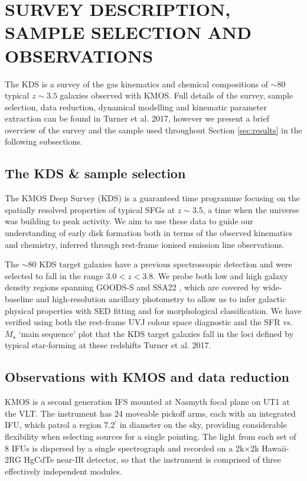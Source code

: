 \documentclass[a4paper,fleqn,usenatbib]{mn2e}
\begin{document}
\section{SURVEY DESCRIPTION, SAMPLE SELECTION AND OBSERVATIONS}\label{sec:sample_and_dr}
The KDS is a survey of the gas kinematics and chemical compositions of $\sim80$typical $z\sim3.5$ galaxies observed with KMOS.
Full details of the survey, sample selection, data reduction, dynamical modelling and kinematic parameter extraction can be found in Turner et al. 2017, however we present a brief overview of the survey and the sample used throughout Section \ref{sec:results} in the following subsections.

\subsection{The KDS \& sample selection}\label{subsec:sample_selection}
The KMOS Deep Survey (KDS) is a guaranteed time programme focusing on the spatially resolved properties of typical SFGs at $z\sim3.5$, a time when the universe was building to peak activity.
We aim to use these data to guide our understanding of early disk formation both in terms of the observed kinematics and chemistry, inferred through rest-frame ionised emission line observations.

The $\sim80$ KDS target galaxies have a previous spectroscopic detection and were selected to fall in the range $3.0 < z < 3.8$.
We probe both low and high galaxy density regions spanning GOODS-S \citep[e.g.][]{Koekemoer2011,Grogin2011,Guo2013} and SSA22 \citep[e.g.][]{Steidel1998}, which are covered by wide-baseline and high-resolution ancillary photometry to allow us to infer galactic physical properties with SED fitting and for morphological classification.
We have verified using both the rest-frame UVJ colour space diagnostic and the SFR vs. $M_{\star}$ `main sequence' plot that the KDS target galaxies fall in the loci defined by typical star-forming at these redshifts Turner et al. 2017. 
\subsection{Observations with KMOS and data reduction}\label{subsec:kmos_observations}
KMOS is a second generation IFS mounted at Nasmyth focal plane on UT1 at the VLT.
The instrument has 24 moveable pickoff arms, each with an integrated IFU, which patrol a region 7.2$^{\prime}$ in diameter on the sky, providing considerable flexibility when selecting sources for a single pointing.
The light from each set of 8 IFUs is dispersed by a single spectrograph and recorded on a 2k$\times$2k Hawaii-2RG HgCdTe near-IR detector, so that the instrument is comprised of three effectively independent modules.
\end{document}
